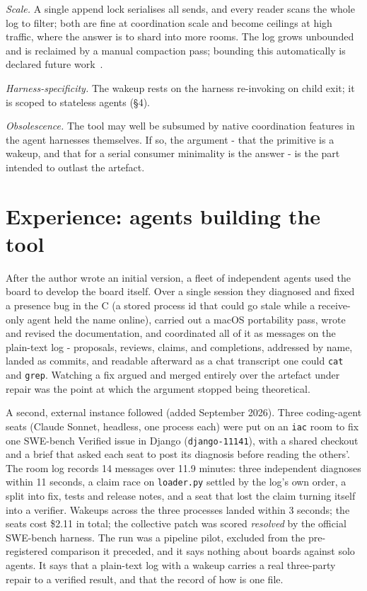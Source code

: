 \documentclass[11pt]{article}
\newcommand{\code}[1]{\texttt{#1}}
\begin{document}
\emph{Scale.} A single append lock serialises all sends, and every reader scans the whole log to filter; both are fine at coordination scale and become ceilings at high traffic, where the answer is to shard into more rooms. The log grows unbounded and is reclaimed by a manual compaction pass; bounding this automatically is declared future work~\cite{roadmap}.

\emph{Harness-specificity.} The wakeup rests on the harness re-invoking on child exit; it is scoped to stateless agents (\S4).

\emph{Obsolescence.} The tool may well be subsumed by native coordination features in the agent harnesses themselves. If so, the argument - that the primitive is a wakeup, and that for a serial consumer minimality is the answer - is the part intended to outlast the artefact.

\section{Experience: agents building the tool}

After the author wrote an initial version, a fleet of independent agents used the board to develop the board itself. Over a single session they diagnosed and fixed a presence bug in the C (a stored process id that could go stale while a receive-only agent held the name online), carried out a macOS portability pass, wrote and revised the documentation, and coordinated all of it as messages on the plain-text log - proposals, reviews, claims, and completions, addressed by name, landed as commits, and readable afterward as a chat transcript one could \code{cat} and \code{grep}. Watching a fix argued and merged entirely over the artefact under repair was the point at which the argument stopped being theoretical.

A second, external instance followed (added September 2026). Three coding-agent seats (Claude Sonnet, headless, one process each) were put on an \code{iac} room to fix one SWE-bench Verified issue in Django (\code{django-11141}), with a shared checkout and a brief that asked each seat to post its diagnosis before reading the others'. The room log records 14 messages over 11.9 minutes: three independent diagnoses within 11 seconds, a claim race on \code{loader.py} settled by the log's own order, a split into fix, tests and release notes, and a seat that lost the claim turning itself into a verifier. Wakeups across the three processes landed within 3 seconds; the seats cost \$2.11 in total; the collective patch was scored \emph{resolved} by the official SWE-bench harness. The run was a pipeline pilot, excluded from the pre-registered comparison it preceded, and it says nothing about boards against solo agents. It says that a plain-text log with a wakeup carries a real three-party repair to a verified result, and that the record of how is one file.
\end{document}

